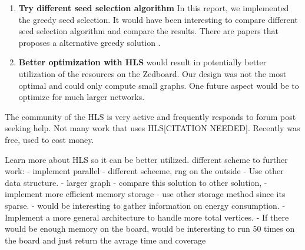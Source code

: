 \begin{enumerate}
\item \textbf{Try different seed selection algorithm} In this report, we implemented the greedy seed selection. It would have been interesting to compare different seed selection algorithm and compare the results. There are papers \citep{Chen:2009:EIM:1557019.1557047} that proposes a alternative greedy solution .  
\item \textbf{Better optimization with HLS} would result in potentially better utilization of the resources on the Zedboard. Our design was not the most optimal and could only compute small graphs. One future aspect would be to optimize for much larger networks.
\end{enumerate}


The community of the HLS is very active and frequently responds to forum post seeking help.	Not many work that uses HLS[CITATION NEEDED]. Recently was free, used to cost money.


Learn more about HLS so it can be better utilized. 
different scheme to further work:
- implement parallel
- different scheeme, rng on the outside
- Use other data structure.
- larger graph
- compare this solution to other solution, 
- implement more efficient memory storage
- use other storage method since its sparse. 
- would be interesting to gather information on  energy consumption.
- Implement a more general architecture to handle more total vertices.
- If  there would be enough memory on the board, would be interesting to run 50 times on the board and just return the avrage time and coverage
